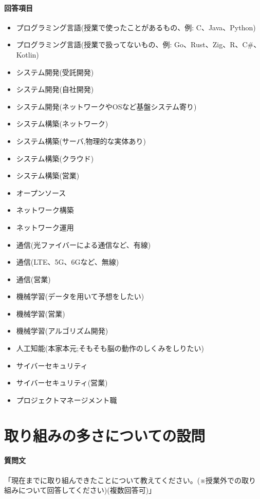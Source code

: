 \documentclass[11pt, a4paper]{jreport}
\begin{document}
\paragraph{回答項目}
\begin{itemize}
\item プログラミング言語(授業で使ったことがあるもの、例: C、Java、Python)
\item プログラミング言語(授業で扱ってないもの、例: Go、Rust、Zig、R、C#、Kotlin)
\item システム開発(受託開発)
\item システム開発(自社開発)
\item システム開発(ネットワークやOSなど基盤システム寄り)
\item システム構築(ネットワーク)
\item システム構築(サーバ,物理的な実体あり)
\item システム構築(クラウド)
\item システム構築(営業)
\item オープンソース
\item ネットワーク構築
\item ネットワーク運用
\item 通信(光ファイバーによる通信など、有線)
\item 通信(LTE、5G、6Gなど、無線)
\item 通信(営業)
\item 機械学習(データを用いて予想をしたい)
\item 機械学習(営業)
\item 機械学習(アルゴリズム開発)
\item 人工知能(本家本元;そもそも脳の動作のしくみをしりたい)
\item サイバーセキュリティ
\item サイバーセキュリティ(営業)
\item プロジェクトマネージメント職
\end{itemize}

\section{取り組みの多さについての設問}

\paragraph{質問文}
「現在までに取り組んできたことについて教えてください。(※授業外での取り組みについて回答してください)(複数回答可)」
\end{document}
